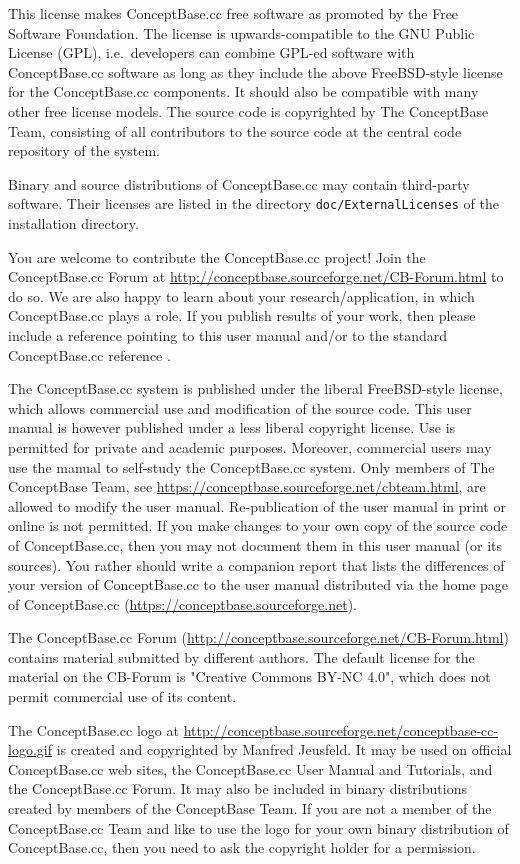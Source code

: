 This license makes ConceptBase.cc free software as promoted by the Free Software Foundation. 
The license is upwards-compatible to the GNU Public License (GPL), i.e.\ developers
can combine GPL-ed software with ConceptBase.cc software as long as they
include the above FreeBSD-style license for the ConceptBase.cc components.
It should also be compatible with many other free license
models. The source code is copyrighted by The ConceptBase Team, consisting of
all contributors to the source code at the central code repository of the system.

Binary and source distributions of ConceptBase.cc may contain third-party software.
Their licenses are listed in the directory {\tt doc/ExternalLicenses}
of the installation directory. 


You are welcome to contribute the ConceptBase.cc project! Join the 
ConceptBase.cc Forum at
\url{http://conceptbase.sourceforge.net/CB-Forum.html} to do so.
We are also happy to learn about your research/application, in which ConceptBase.cc plays a role.
If you publish results of your work, then please include a reference pointing to this
user manual and/or to the standard ConceptBase.cc reference \cite{JIIS}. 

The ConceptBase.cc system is published under the liberal FreeBSD-style license, which allows
commercial use and modification of the source code. This user manual is
however published under a less liberal copyright license. Use is permitted for
private and academic purposes. Moreover, commercial users may use the manual to
self-study the ConceptBase.cc system. Only members of The ConceptBase Team,
see \url{https://conceptbase.sourceforge.net/cbteam.html}, are allowed to modify the user manual.
Re-publication of the user manual in print or online is not permitted.
If you make changes to your own copy of the source code of ConceptBase.cc,
then you may not document them in this user manual (or its sources).
You rather should write a companion report that lists the differences of
your version of ConceptBase.cc to the user manual distributed via the home page of
ConceptBase.cc (\url{https://conceptbase.sourceforge.net}). 

The ConceptBase.cc Forum (\url{http://conceptbase.sourceforge.net/CB-Forum.html})
contains material submitted by different authors. The default license for
the material on the CB-Forum is "Creative Commons BY-NC 4.0", which does not permit
commercial use of its content. 

The ConceptBase.cc logo at \url{http://conceptbase.sourceforge.net/conceptbase-cc-logo.gif}
is created and copyrighted by Manfred Jeusfeld. It may be used on official
ConceptBase.cc web sites, the ConceptBase.cc User Manual and Tutorials, and the ConceptBase.cc Forum.
It may also be included in binary distributions created by members of the ConceptBase Team.
If you are not a member of the ConceptBase.cc Team and like to use the logo for your own binary
distribution of ConceptBase.cc, then you need to ask the copyright holder for a permission.


